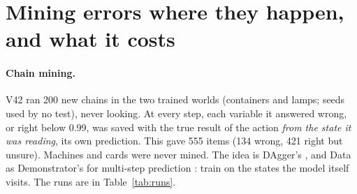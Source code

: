 \documentclass[11pt]{article}
\newcommand{\prereg}{\textsc{pre-registered}}
\begin{document}
\begin{table}[t]\centering\small
\caption{What did not fix it: post-hoc recalibration (\prereg; V42's answers, fit on separate items)
and training losses (\prereg; 200 more steps from the V42 adapter, the trainer's readout). ``Errors at
$\ge 0.9$'': share of the errors, T / U. Appendix~\ref{app:overlap}: the same without the questions that overlap the
training rows.}
\label{tab:nulls}
\end{table}

\section{Mining errors where they happen, and what it costs}\label{sec:dagger}
\paragraph{Chain mining.} V42 ran 200 new chains in the two trained worlds (containers and lamps; seeds
used by no test), never looking. At every step, each variable it answered wrong, or right below 0.99, was saved with
the true result of the action \emph{from the state it was reading}, its own prediction. This gave 555 items (134 wrong,
421 right but unsure). Machines and cards were never mined. The idea is DAgger's \cite{ross2011}, and Data as
Demonstrator's for multi-step prediction \cite{venkatraman2015}: train on the states the model itself visits. The runs
are in Table~\ref{tab:runs}.
\end{document}
